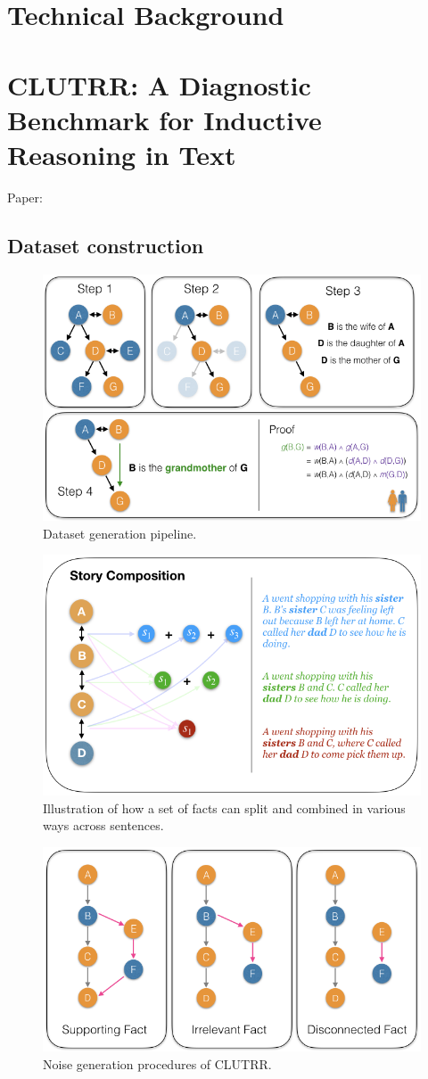 \documentclass[letterpaper, 12pt]{report}
\begin{document}
\section{Technical Background}
\label{sec:org6187e60}
\section{CLUTRR: A Diagnostic Benchmark for Inductive Reasoning in Text}
\label{sec:orgd01b38f}

Paper: \cite{sinha2019a}

\subsection{Dataset construction}
\label{sec:org704afa9}

\begin{figure}[htbp]
\centering
\includegraphics[height=0.3\textwidth]{figs/clutrr/dataset_const_proof.png}
\caption{Dataset generation pipeline.}
\end{figure}

\begin{figure}[htbp]
\centering
\includegraphics[height=0.3\textwidth]{figs/clutrr/composition.png}
\caption{Illustration of how a set of facts can split and combined in various ways across sentences.}
\end{figure}

\begin{figure}[htbp]
\centering
\includegraphics[height=0.3\textwidth]{figs/clutrr/clutrr_noise.png}
\caption{Noise generation procedures of CLUTRR.}
\end{figure}
\end{document}
